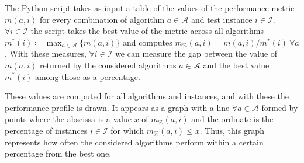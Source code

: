 The Python script takes as input a table of the values of the performance metric $m(a,i)$ for every combination of algorithm $a\in \mathcal{A}$ and test instance $i\in \mathcal{I}$. $\forall i\in \mathcal{I}$ the script takes the best value of the metric across all algorithms $m^*(i)\coloneq\max_{a\in\mathcal{A}}\{m(a,i)\}$ and computes $m_\%(a,i)=m(a,i)/m^*(i) \ \forall a$. With these measures, $\forall i\in \mathcal{I}$ we can measure the gap between the value of $m(a,i)$ returned by the considered algorithms $a\in\mathcal{A}$ and the best value $m^*(i)$ among those as a percentage.

These values are computed for all algorithms and instances, and with these the performance profile is drawn. It appears as a graph with a line $\forall a\in\mathcal{A}$ formed by points where the abscissa is a value $x$ of $m_\%(a,i)$ and the ordinate is the percentage of instances $i\in\mathcal{I}$ for which $m_\%(a,i)\leq x$. Thus, this graph represents how often the considered algorithms perform within a certain percentage from the best one.